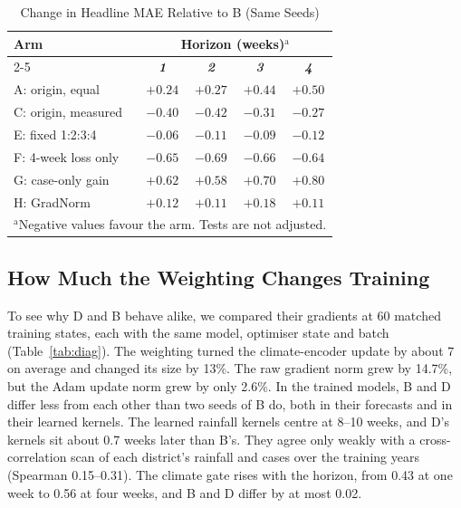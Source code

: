 \documentclass[conference]{IEEEtran}
\begin{document}
\begin{table}[htbp]
\caption{Change in Headline MAE Relative to B (Same Seeds)}
\begin{center}
\begin{tabular}{|l|c|c|c|c|}
\hline
\textbf{Arm} & \multicolumn{4}{|c|}{\textbf{Horizon (weeks)}$^{\mathrm{a}}$} \\
\cline{2-5}
 & \textbf{\textit{1}} & \textbf{\textit{2}} & \textbf{\textit{3}} & \textbf{\textit{4}} \\
\hline
A: origin, equal & $+0.24$ & $+0.27$ & $+0.44$ & $+0.50$ \\
C: origin, measured & $-0.40$ & $-0.42$ & $-0.31$ & $-0.27$ \\
E: fixed 1:2:3:4 & $-0.06$ & $-0.11$ & $-0.09$ & $-0.12$ \\
F: 4-week loss only & $\mathbf{-0.65}$ & $\mathbf{-0.69}$ & $\mathbf{-0.66}$ & $\mathbf{-0.64}$ \\
G: case-only gain & $+0.62$ & $+0.58$ & $+0.70$ & $+0.80$ \\
H: GradNorm & $+0.12$ & $+0.11$ & $+0.18$ & $+0.11$ \\
\hline
\multicolumn{5}{l}{$^{\mathrm{a}}$Negative values favour the arm. Tests are not adjusted.}
\end{tabular}
\label{tab:explore}
\end{center}
\end{table}

\subsection{How Much the Weighting Changes Training}

To see why D and B behave alike, we compared their gradients at 60 matched training states, each with the same model, optimiser state and batch (Table~\ref{tab:diag}). The weighting turned the climate-encoder update by about 7\textdegree{} on average and changed its size by 13\%. The raw gradient norm grew by 14.7\%, but the Adam update norm grew by only 2.6\%. In the trained models, B and D differ less from each other than two seeds of B do, both in their forecasts and in their learned kernels. The learned rainfall kernels centre at 8--10 weeks, and D's kernels sit about 0.7 weeks later than B's. They agree only weakly with a cross-correlation scan of each district's rainfall and cases over the training years (Spearman 0.15--0.31). The climate gate rises with the horizon, from 0.43 at one week to 0.56 at four weeks, and B and D differ by at most 0.02.
\end{document}
